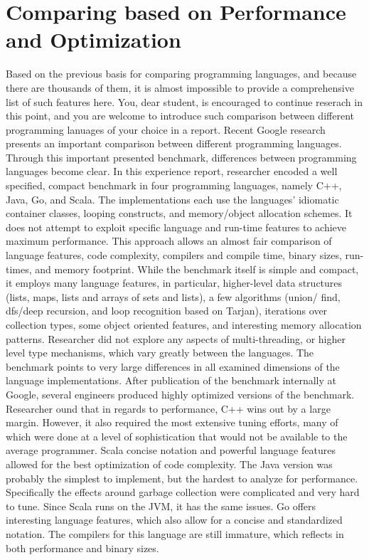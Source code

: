\documentclass[12pt,a4paper,final,twoside,onecolumn,titlepage]{book}
\begin{document}
\section{Comparing based on Performance and Optimization}
Based on the previous basis for comparing programming languages, and because there are thousands of them, it is almost impossible to provide a comprehensive list of such features here. You, dear student, is encouraged to continue reserach in this point, and you are welcome to introduce such comparison between different programming lanuages of your choice in a report. Recent Google research \cite{Robert-Google} presents an important comparison between different programming languages. Through this important presented benchmark, differences between programming languages become clear. In this experience report, researcher encoded a well specified, compact benchmark in four programming languages, namely C++, Java, Go, and Scala. The implementations each use the languages' idiomatic container classes, looping constructs, and memory/object allocation schemes. It does not attempt to exploit specific language and run-time features to achieve maximum performance. This approach allows an almost fair comparison of language features, code complexity, compilers and compile time, binary sizes, run-times, and memory footprint. While the benchmark itself is simple and compact, it employs many language features, in particular, higher-level data structures (lists, maps, lists and arrays of sets and lists), a few algorithms (union/ find, dfs/deep recursion, and loop recognition based on Tarjan), iterations over collection types, some object oriented features, and interesting memory allocation patterns. Researcher did not explore any aspects of multi-threading, or higher level  type mechanisms, which vary greatly between the languages. The benchmark points to very large differences in all examined dimensions of the language implementations. After publication of the benchmark internally at Google, several engineers produced highly optimized versions of the benchmark. Researcher ound that in regards to performance, C++ wins out by a large margin. However, it also required the most extensive tuning efforts, many of which were done at a level of sophistication that would not be available to the average programmer. Scala concise notation and powerful language features allowed for the best optimization of code complexity. The Java version was probably the simplest to implement, but the hardest to analyze for performance. Specifically the effects around garbage collection were complicated and very hard to tune. Since Scala runs on the JVM, it has the same issues. Go offers interesting language features, which also allow for a concise and standardized notation. The compilers for this language are still immature, which reflects in both performance and binary sizes.
\end{document}
